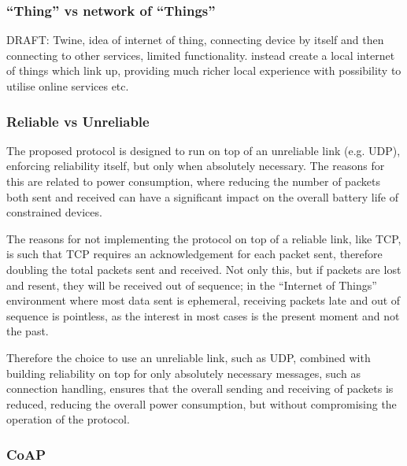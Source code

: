 \subsubsection{``Thing'' vs network of ``Things''} %
\label{ssub:_thing_vs_network_of_things_}
DRAFT: Twine, idea of internet of thing, connecting device by itself and then connecting to other services, limited functionality. instead create a local internet of things which link up, providing much richer local experience with possibility to utilise online services etc.

\subsubsection{Reliable vs Unreliable} %
\label{ssub:reliable_vs_unreliable}
The proposed protocol is designed to run on top of an unreliable link (e.g. UDP), enforcing reliability itself, but only when absolutely necessary. The reasons for this are related to power consumption, where reducing the number of packets both sent and received can have a significant impact on the overall battery life of constrained devices. 

The reasons for not implementing the protocol on top of a reliable link, like TCP, is such that TCP requires an acknowledgement for each packet sent, therefore doubling the total packets sent and received. Not only this, but if packets are lost and resent, they will be received out of sequence; in the ``Internet of Things'' environment where most data sent is ephemeral, receiving packets late and out of sequence is pointless, as the interest in most cases is the present moment and not the past. 

Therefore the choice to use an unreliable link, such as UDP, combined with building reliability on top for only absolutely necessary messages, such as connection handling, ensures that the overall sending and receiving of packets is reduced, reducing the overall power consumption, but without compromising the operation of the protocol.


\subsubsection{CoAP} %
\label{ssub:coap}


